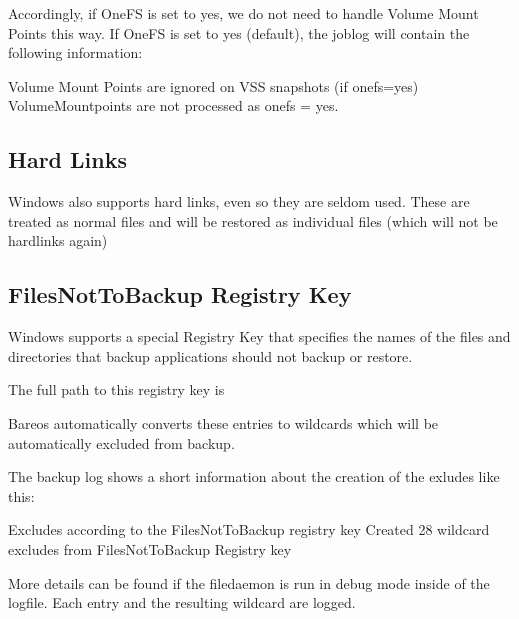 Accordingly, if OneFS is set to yes, we do not need to handle Volume Mount Points this way.
If OneFS is set to yes (default), the joblog will contain the following information: 

\begin{bmessage}{Volume Mount Points are ignored on VSS snapshots (if onefs=yes)}
VolumeMountpoints are not processed as onefs = yes.
\end{bmessage}


\subsection{Hard Links}

Windows also supports hard links, even so they are seldom used.
These are treated as normal files and will be restored as individual files (which will not be hardlinks again)


\subsection{FilesNotToBackup Registry Key}
    \label{FilesNotToBackup}


Windows supports a special Registry Key that specifies the names of the files and directories that backup applications should not backup or restore.

The full path to this registry key is 

Bareos automatically converts these entries to wildcards which will be automatically excluded from backup.

The backup log shows a short information about the creation of the exludes like this:

\begin{bmessage}{Excludes according to the FilesNotToBackup registry key}
Created 28 wildcard excludes from FilesNotToBackup Registry key
\end{bmessage}

More details can be found if the filedaemon is run in debug mode inside of the  logfile. 
Each entry and the resulting wildcard are logged.

